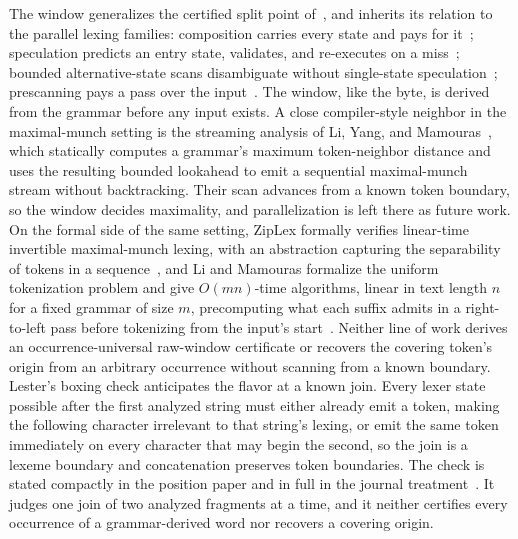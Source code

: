 \documentclass[11pt,a4paper]{article}
\theoremstyle{definition}
\theoremstyle{plain}
\begin{document}
The window generalizes the certified split point of~\cite{nidhogg2026splitpoints}, and inherits its relation to the
parallel lexing families: composition carries every state and pays for it~\cite{mytkowicz2014dpfsm}; speculation
predicts an entry state, validates, and re-executes on a miss~\cite{prabhu2010speculative}; bounded alternative-state
scans disambiguate without single-state speculation~\cite{barenghi2015parallel}; prescanning pays a pass over the
input~\cite{li2021plex}. The window, like the byte, is derived from the grammar before any input exists. A close
compiler-style neighbor in the maximal-munch setting is the streaming analysis of Li, Yang, and
Mamouras~\cite{li2026streaming}, which statically computes a grammar's maximum token-neighbor distance and uses the
resulting bounded lookahead to emit a sequential maximal-munch stream without backtracking. Their scan advances from a
known token boundary, so the window decides maximality, and parallelization is left there as future work. On the formal
side of the same setting, ZipLex formally verifies linear-time invertible maximal-munch lexing, with an abstraction
capturing the separability of tokens in a sequence~\cite{chassot2026ziplex}, and Li and Mamouras formalize the uniform
tokenization problem and give $O(mn)$-time algorithms, linear in text length $n$ for a fixed grammar of size $m$,
precomputing what each suffix admits in a right-to-left pass before tokenizing from the input's
start~\cite{li2025uniform}. Neither line of work derives an occurrence-universal raw-window certificate or recovers the
covering token's origin from an arbitrary occurrence without scanning from a known boundary. Lester's boxing check
anticipates the flavor at a known join. Every lexer state possible after the first analyzed string must either already
emit a token, making the following character irrelevant to that string's lexing, or emit the same token immediately on
every character that may begin the second, so the join is a lexeme boundary and concatenation preserves token
boundaries. The check is stated compactly in the position paper and in full in the journal
treatment~\cite{lester2013boxing, lester2016flow}. It judges one join of two analyzed fragments at a time, and it
neither certifies every occurrence of a grammar-derived word nor recovers a covering origin.
\end{document}
